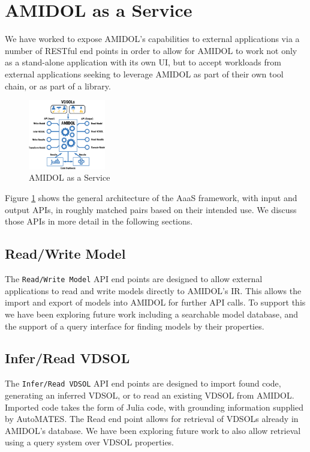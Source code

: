 \documentclass[12pt]{galois-whitepaper}
\begin{document}
\section{AMIDOL as a Service}

We have worked to expose AMIDOL's capabilities to external
applications via a number of RESTful end points in order to allow for
AMIDOL to work not only as a stand-alone application with its own UI,
but to accept workloads from external applications seeking to leverage
AMIDOL as part of their own tool chain, or as part of a library.

\begin{figure}
  \centering
  \includegraphics[width=0.3\textwidth]{figs/AMIDOL-service.png}
  \caption{AMIDOL as a Service}
  \label{Fig:Service}
\end{figure}

Figure \ref{Fig:Service} shows the general architecture of the AaaS
framework, with input and output APIs, in roughly matched pairs based
on their intended use.  We discuss those APIs in more
detail in the following sections.

\subsection{Read/Write Model}

The \texttt{Read/Write Model} API end points are designed to allow
external applications to read and write models directly to AMIDOL's
IR.  This allows the import and export of models into AMIDOL for
further API calls.  To support this we have been exploring future work
including a searchable model database, and the support of a query
interface for finding models by their properties.

\subsection{Infer/Read VDSOL}

The \texttt{Infer/Read VDSOL} API end points are designed to import
found code, generating an inferred VDSOL, or to read an existing VDSOL
from AMIDOL.  Imported code takes the form of Julia code, with
grounding information supplied by AutoMATES.  The Read end point allows
for retrieval of VDSOLs already in AMIDOL's database.  We have been
exploring future work to also allow retrieval using a query system
over VDSOL properties.
\end{document}
